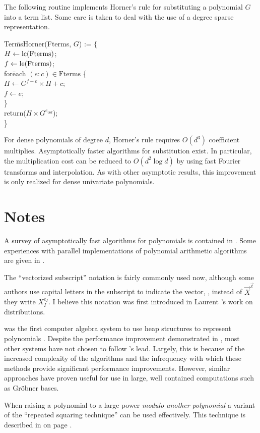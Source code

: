 The following routine implements Horner's rule for substituting a
polynomial $G$ into a term list.  Some care is taken to deal with the
use of a degree sparse representation. 

\begindsacode
Ter\=msHorner(Fterms, $G$) := $\{$ \\
\> $H \leftarrow \operatorname{lc}(\mbox{Fterms})$; \\
\> $f \leftarrow \operatorname{le}(\mbox{Fterms})$; \\
\> for\=each $(e : c) \in \mbox{Fterms}$ \{ \\
\>\> $H \leftarrow G^{f - e} \times H + c$; \\
\>\> $f \leftarrow e$; \\
\>\> \} \\
\> return($H \times G^{e_{old}}$); \\
\> \}
\enddsacode

For dense polynomials of degree $d$, Horner's rule requires $O(d^3)$
coefficient multiplies.  Asymptotically faster algorithms for
substitution exist.  In particular, the multiplication cost can be
reduced to $O(d^2 \log d)$ by using fast Fourier transforms and
interpolation.  As with other asymptotic results, this improvement is
only realized for dense univariate polynomials.

\section*{Notes}

\small

A survey of asymptotically fast algorithms for polynomials is
contained in \cite{Pan1992-dl}.  Some experiences with parallel
implementations of polynomial arithmetic algorithms are given in
\cite{Ponder1991-zd, Silverman1990-hp}. 

 The ``vectorized subscript''
notation is fairly commonly used now, although some authors use
capital letters in the subscript to indicate the vector, \ie, instead
of $\vec{X}^{\vec{e}}$ they write $X_I^{e_I}$.  I believe this
notation was first introduced in Laurent {\SchwartzL}'s work on
distributions.

 {\Altran} was the first computer algebra
system to use heap structures to represent polynomials
\cite{Brown1973-gv}.  Despite the performance improvement demonstrated
in {\Altran} \cite{Sundblad1973-wi}, most other systems have not chosen to
follow {\Altran}'s lead.  Largely, this is because of the increased
complexity of the algorithms and the infrequency with which these
methods provide significant performance improvements.  However,
similar approaches have proven useful for use in large, well contained
computations such as Gr\"{o}bner bases.

 When raising a polynomial to a large
power {\em modulo another polynomial} a variant of the ``repeated
squaring technique'' can be used effectively.  This technique is
described in  on page
\pageref{FFac:Distinct:Sec}.

\normalsize


